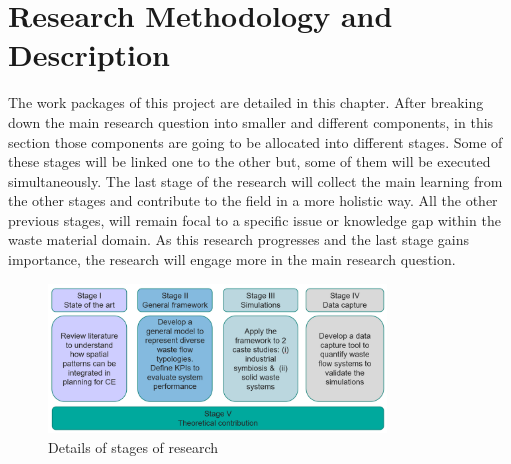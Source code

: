 \chapter{Research Methodology and Description}
The work packages of this project are detailed in this chapter. After breaking down the main research question into smaller and different components, in this section those components are going to be allocated into different stages. Some of these stages will be linked one to the other but, some of them will be executed simultaneously. The last stage of the research will collect the main learning from the other stages and contribute to the field in a more holistic way. All the other previous stages, will remain focal to a specific issue or knowledge gap within the waste material domain. As this research progresses and the last stage gains importance, the research will engage more in the main research question.

\begin{figure}[h!]
    \centering
    \includegraphics[width=0.8\textwidth]{sections/asset/stage.PNG}
    \caption{Details of stages of research}
    \label{fig:research1s}
\end{figure}


